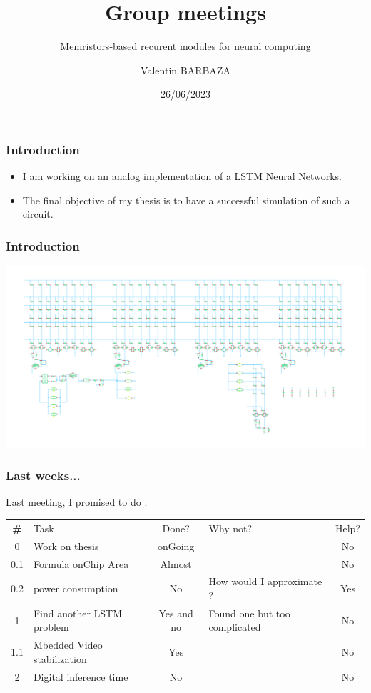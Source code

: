 \documentclass[table]{beamer}
\title{Group meetings}
\subtitle{Memristors-based recurent modules for neural computing}
\author[V. BARBAZA]{Valentin BARBAZA}
\date{26/06/2023}
\begin{document}
\frame{\titlepage}


\begin{frame}
  \frametitle{Introduction}

  \begin{itemize}
      \color{text}
    \item I am working on an analog implementation of a LSTM Neural Networks.
    \item The final objective of my thesis is to have a successful simulation of such a circuit.
  \end{itemize}

\end{frame}


\begin{frame}
  \frametitle{Introduction}
  \centering\includegraphics[width=\textwidth]{lstm/lstm-np}
\end{frame}

\begin{frame}
  \frametitle{Last weeks...}

  Last meeting, I promised to do :

  \centering
  \begin{tabular}{c p{} c p{} c}
    \rowcolor{firstRow}
    \color{white}\textbf{\#} & \centering\color{white}Task & \color{white}Done? & \color{white}Why not? & \color{white}Help? \\
    0 & Work on thesis & onGoing & & No\\
    0.1 & Formula onChip Area & Almost & & No\\
    0.2 & power consumption & No & How would I approximate ? & Yes \\
    1 & Find another LSTM problem & Yes and no & Found one but too complicated & No\\
    1.1 & Mbedded Video stabilization & Yes & & No\\
    2 & Digital inference time & No & & No\\
  \end{tabular}

\end{frame}
\end{document}
